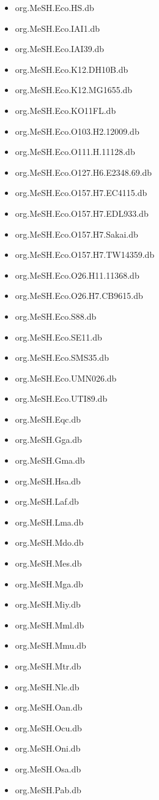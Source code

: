 \documentclass[margin,line,10pt]{res}
\newenvironment{list1}{
  \begin{list}{\ding{113}}{%
      \setlength{\itemsep}{0in}
      \setlength{\parsep}{0in} \setlength{\parskip}{0in}
      \setlength{\topsep}{0in} \setlength{\partopsep}{0in} 
      \setlength{\leftmargin}{0.17in}}}{\end{list}}
\begin{document}
\begin{resume}
\begin{list1}
\begin{multicols}{2}
\begin{itemize}
\item org.MeSH.Eco.HS.db
\item org.MeSH.Eco.IAI1.db 
\item org.MeSH.Eco.IAI39.db 
\item org.MeSH.Eco.K12.DH10B.db
\item org.MeSH.Eco.K12.MG1655.db
\item org.MeSH.Eco.KO11FL.db 
\item org.MeSH.Eco.O103.H2.12009.db
\item org.MeSH.Eco.O111.H.11128.db 
\item org.MeSH.Eco.O127.H6.E2348.69.db
\item org.MeSH.Eco.O157.H7.EC4115.db
\item org.MeSH.Eco.O157.H7.EDL933.db 
\item org.MeSH.Eco.O157.H7.Sakai.db
\item org.MeSH.Eco.O157.H7.TW14359.db
\item org.MeSH.Eco.O26.H11.11368.db 
\item org.MeSH.Eco.O26.H7.CB9615.db 
\item org.MeSH.Eco.S88.db
\item org.MeSH.Eco.SE11.db 
\item org.MeSH.Eco.SMS35.db 
\item org.MeSH.Eco.UMN026.db
\item org.MeSH.Eco.UTI89.db 
\item org.MeSH.Eqc.db 
\item org.MeSH.Gga.db
\item org.MeSH.Gma.db 
\item org.MeSH.Hsa.db
\item org.MeSH.Laf.db 
\item org.MeSH.Lma.db 
\item org.MeSH.Mdo.db 
\item org.MeSH.Mes.db 
\item org.MeSH.Mga.db 
\item org.MeSH.Miy.db 
\item org.MeSH.Mml.db 
\item org.MeSH.Mmu.db 
\item org.MeSH.Mtr.db 
\item org.MeSH.Nle.db 
\item org.MeSH.Oan.db 
\item org.MeSH.Ocu.db 
\item org.MeSH.Oni.db 
\item org.MeSH.Osa.db 
\item org.MeSH.Pab.db 

\end{itemize}
\end{multicols}
\end{list1}
\end{resume}
\end{document}
